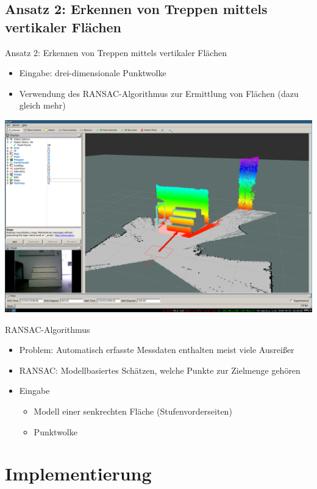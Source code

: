 \documentclass[18pt]{beamer}
\begin{document}
\subsection{Ansatz 2: Erkennen von Treppen mittels vertikaler Flächen}
\begin{frame}{Ansatz 2: Erkennen von Treppen mittels vertikaler Flächen}
\begin{itemize}
	\item Eingabe: drei-dimensionale Punktwolke
	\item Verwendung des RANSAC-Algorithmus zur Ermittlung von Flächen (dazu gleich mehr)
\end{itemize}
\begin{center}
	\includegraphics[scale=0.13]{images/screenshot_pointcloud.png}
\end{center}
\end{frame}

\begin{frame}{RANSAC-Algorithmus}
\begin{itemize}
	\item Problem: Automatisch erfasste Messdaten enthalten meist viele Ausreißer
	\item RANSAC: Modellbasiertes Schätzen, welche Punkte zur Zielmenge gehören
	\item Eingabe
	\begin{itemize}
		\item Modell einer senkrechten Fläche (Stufenvorderseiten)
		\item Punktwolke
	\end{itemize}
\end{itemize}
\end{frame}


\section{Implementierung}
\end{document}
